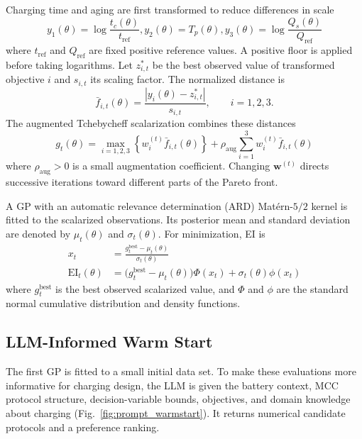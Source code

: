 Charging time and aging are first transformed to reduce differences in scale
\begin{equation}
 y_1(\theta)=\log\!\frac{t_c(\theta)}{t_{\mathrm{ref}}},
 y_2(\theta)=T_p(\theta),
 y_3(\theta)=\log\!\frac{Q_s(\theta)}{Q_{\mathrm{ref}}}
 \label{eq:objective_transform}
\end{equation}
where $t_{\mathrm{ref}}$ and $Q_{\mathrm{ref}}$ are fixed positive reference
values. A positive floor is applied before taking logarithms. Let
$z_{i,t}^{*}$ be the best observed value of transformed objective $i$ and
$s_{i,t}$ its scaling factor. The normalized distance is
\begin{equation}
 \bar f_{i,t}(\theta)=
 \frac{|y_i(\theta)-z_{i,t}^{*}|}{s_{i,t}},\qquad i=1,2,3.
 \label{eq:objective_scaling}
\end{equation}
The augmented Tchebycheff scalarization combines these distances
\begin{equation}
 g_t(\theta)=
 \max_{i=1,2,3}\!\left\{w_i^{(t)}\bar f_{i,t}(\theta)\right\}
 +\rho_{\mathrm{aug}}\sum_{i=1}^{3}w_i^{(t)}\bar f_{i,t}(\theta)
 \label{eq:tchebycheff}
\end{equation}
where $\rho_{\mathrm{aug}}>0$ is a small augmentation coefficient. Changing
$\mathbf w^{(t)}$ directs successive iterations toward different parts of the
Pareto front.

A GP with an automatic relevance determination (ARD) Mat\'ern-$5/2$ kernel is
fitted to the scalarized observations. Its posterior mean and standard
deviation are denoted by $\mu_t(\theta)$ and $\sigma_t(\theta)$. For
minimization, EI is
\begin{align}
 x_t&=\frac{g_t^{\mathrm{best}}-\mu_t(\theta)}{\sigma_t(\theta)}\\
 \mathrm{EI}_t(\theta)
 &=\bigl(g_t^{\mathrm{best}}-\mu_t(\theta)\bigr)\Phi(x_t)
 +\sigma_t(\theta)\phi(x_t)
 \label{eq:ei}
\end{align}
where $g_t^{\mathrm{best}}$ is the best observed scalarized value, and
$\Phi$ and $\phi$ are the standard normal cumulative distribution and density
functions.

\subsection{LLM-Informed Warm Start}
\label{sec:warm_start}

The first GP is fitted to a small initial data set. To make these evaluations
more informative for charging design, the LLM is given the battery context,
MCC protocol structure, decision-variable bounds, objectives, and domain
knowledge about charging (Fig.~\ref{fig:prompt_warmstart}). It returns
numerical candidate protocols and a preference ranking.

